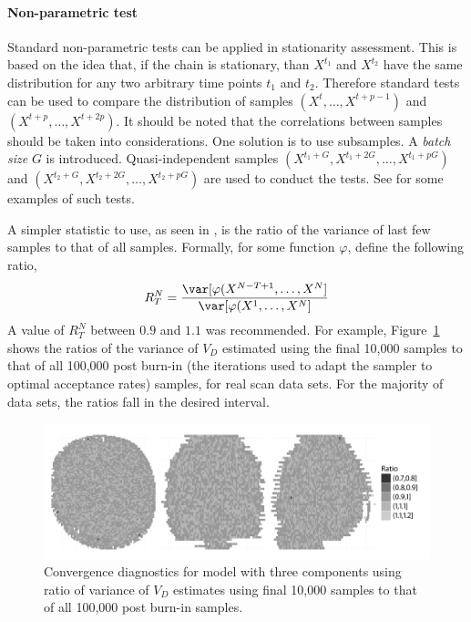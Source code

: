\paragraph{Non-parametric test}

Standard non-parametric tests can be applied in stationarity assessment. This
is based on the idea that, if the chain is stationary, than $X^{t_1}$ and
$X^{t_2}$ have the same distribution for any two arbitrary time points $t_1$
and $t_2$. Therefore standard tests can be used to compare the distribution of
samples $(X^t,\dots,X^{t+p-1})$ and $(X^{t+p},\dots,X^{t+2p})$. It should be
noted that the correlations between samples should be taken into
considerations. One solution is to use subsamples. A \emph{batch size} $G$ is
introduced. Quasi-independent samples
$(X^{t_1+G},X^{t_1+2G},\dots,X^{t_1+pG})$ and
$(X^{t_2+G},X^{t_2+2G},\dots,X^{t_2+pG})$ are used to conduct the tests. See
\cite[][sec.~12.2.2]{Robert:2004tn} for some examples of such tests.

A simpler statistic to use, as seen in \cite{Gelman:2011vx}, is the ratio of
the variance of last few samples to that of all samples. Formally, for some
function $\varphi$, define the following ratio,
\begin{equation}
  R_T^N = \frac{\var[\varphi(X^{N-T+1},\dots,X^{N}]}
  {\var[\varphi(X^{1},\dots,X^{N}]}
\end{equation}
A value of $R_T^N$ between $0.9$ and $1.1$ was recommended. For example,
Figure~\ref{fig:pet diag ratio} shows the ratios of the variance of $V_D$
estimated using the final 10,000 samples to that of all 100,000 post burn-in
(the iterations used to adapt the sampler to optimal acceptance rates)
samples, for real \pet scan data sets. For the majority of data sets, the
ratios fall in the desired interval.

\begin{figure}
  \includegraphics[width=\linewidth]{fig/PET_Converge}
  \caption{Convergence diagnostics for \pet model with three components using
    ratio of variance of $V_D$ estimates using final 10,000 samples to that of
    all 100,000 post burn-in samples.}
  \label{fig:pet diag ratio}
\end{figure}

